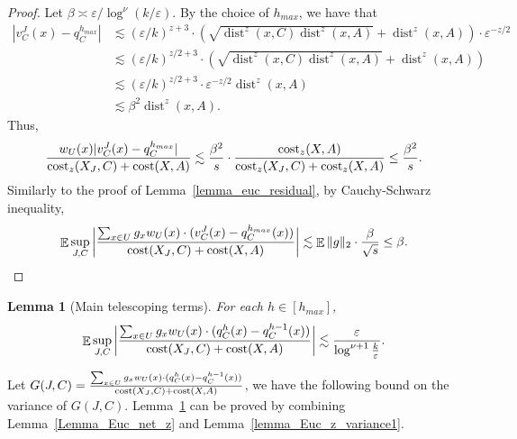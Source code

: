 \documentclass[11pt,letterpaper]{article}
\newtheorem{lemma}[theorem]{Lemma}
\theoremstyle{definition}
\newcommand{\eps}{\varepsilon}
\DeclareMathOperator*{\E}{\ensuremath{\mathbb{E}}}
\DeclareMathOperator{\dist}{dist}
\DeclarePairedDelimiter{\abs}{\lvert}{\rvert}
\begin{document}
\begin{proof}
Let $\beta \asymp \eps/\log^{\nu}(k/\eps)$.
By the choice of $h_{max}$, we have that 
\begin{align*}
|v_C^J(x)-q_C^{h_{max}}|
&\lesssim (\eps/k)^{z+3} \cdot (\sqrt{\dist^z(x,C)\dist^z(x,A)}+\dist^z(x,A))\cdot \eps^{-z/2}\\
&\lesssim (\eps/k)^{z/2+3} \cdot (\sqrt{\dist^z(x,C)\dist^z(x,A)}+\dist^z(x,A)) \\
&\lesssim (\eps/k)^{z/2+3} \cdot \eps^{-z/2} \dist^z(x,A) \\
&\lesssim \beta^2 \dist^z(x,A).
\end{align*}
%
Thus, 
\[
\frac{w_U(x) \abs{v_C^J(x)-q_C^{h_{max}}}}{\cost_z(X_J,C)+\cost(X,A)}\lesssim \frac{\beta^2}{s}\cdot \frac{\cost_z(X,A)}{\cost_z(X_J,C)+\cost_z(X,A)} \leq \frac{\beta^2}{s}.
\]
Similarly to the proof of Lemma~\ref{lemma_euc_residual}, by Cauchy-Schwarz inequality, 
\[
\E\sup_{J,C}\bigg|\frac{\sum_{x\in U} g_x w_U(x)\cdot (v_C^J(x)-q_C^{h_{max}}(x))}{\cost(X_J,C)+\cost(X,A)}\bigg|\lesssim \E \|g\|_2 \cdot \frac{\beta}{\sqrt{s}}\leq \beta. \qedhere
\]
\end{proof}

\begin{lemma}[Main telescoping terms] \label{lemma_Euc_chaining_z_main_main}
For each $h\in [h_{max}]$,
$$
\E\sup_{J,C}\bigg|\frac{\sum_{x\in U} g_x w_U(x)\cdot (q_C^h(x)-q_C^{h-1}(x))}{\cost(X_J,C)+\cost(X,A)}\bigg|\lesssim \frac{\eps}{\log^{\nu+1}\frac{k}{\eps}}.
$$
\end{lemma}

Let $G(J,C)=\frac{\sum_{x\in U} g_x w_U(x)\cdot (q_C^h(x)-q_C^{h-1}(x))}{\cost(X_J,C)+\cost(X,A)}$, we have the following bound on the variance of $G(J,C)$. Lemma~\ref{lemma_Euc_chaining_z_main_main} can be proved by combining Lemma~\ref{Lemma_Euc_net_z} and Lemma~\ref{lemma_Euc_z_variance1}.
\end{document}
